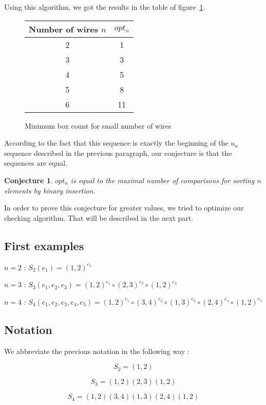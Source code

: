 \documentclass[11pt, a4paper]{article}
\newtheorem*{Conj*}{Conjecture}
\begin{document}
Using this algorithm, we got the results in the table of figure~\ref{box-count}.

\begin{figure}
    \centering
    \begin{tabular}{|c|c|}
    \hline
    Number of wires $n$ & $opt_n$ \\
    \hline
    2 & 1 \\
    3 & 3 \\
    4 & 5 \\
    5 & 8 \\
    6 & 11 \\
    \hline
    \end{tabular}
    \caption{Minimum box count for small number of wires}
    \label{box-count}
\end{figure}

According to the fact that this sequence is exactly the beginning of the $u_n$
sequence described in the previous paragraph, our conjecture is that the
sequences are equal.

\Large
\begin{Conj*}
$opt_n$ is equal to the maximal number of comparisons for sorting $n$ elements
by binary insertion.
\end{Conj*}
\normalsize

In order to prove this conjecture for greater values, we tried to optimize our
checking algorithm. That will be described in the next part.

\subsection{First examples}

$n=2$ : $S_2(e_1) = (1,2)^{e_1}$

$n=3$ : $S_3(e_1,e_2,e_3) = (1,2)^{e_1} \circ (2,3)^{e_2} \circ (1,2)^{e_3}$

$n=4$ : $S_4(e_1,e_2,e_3,e_4,e_5) = (1, 2)^{e_1} \circ (3,4)^{e_2} \circ
(1,3)^{e_3} \circ (2, 4)^{e_4} \circ (1,2)^{e_5}$

\subsection {Notation}

We abbreviate the previous notation in the following way :

$$S_2 = (1,2)$$

$$S_3 = (1,2)(2,3)(1,2)$$

$$S_4 = (1,2)(3,4)(1,3)(2,4)(1,2)$$
\end{document}
